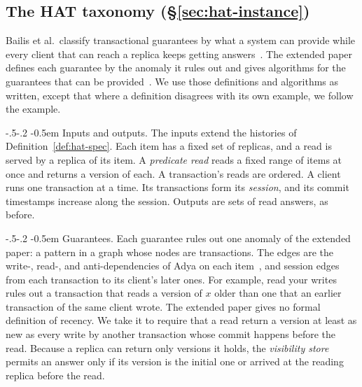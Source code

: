 \documentclass[sigconf]{cidr-2027}
\makeatletter
\theoremstyle{remark}
\renewcommand\paragraph{\@startsection{paragraph}{4}{\z@}%
  {-.5\baselineskip \@plus -2\p@ \@minus -.2\p@}%
  {-0.5em}%
  {\normalfont\bfseries}}
\makeatother
\begin{document}
\subsection{The HAT taxonomy (\S\ref{sec:hat-instance})}
\label{app:hat-taxonomy}

Bailis et al.\ classify transactional guarantees by what a system can provide
while every client that can reach a replica keeps getting
answers~\cite{bailis2013hat}. The extended paper defines each guarantee by
the anomaly it rules out and gives algorithms for the guarantees that can be
provided~\cite{bailis2013hatextended}. We use those definitions and
algorithms as written, except that where a definition disagrees with its own
example, we follow the example.

\paragraph{Inputs and outputs.}
The inputs extend the histories of Definition~\ref{def:hat-spec}. Each item
has a fixed set of replicas, and a read is served by a replica of its item. A
\emph{predicate read} reads a fixed range of items at once and returns a
version of each. A transaction's reads are ordered. A client runs one
transaction at a time. Its transactions form its \emph{session}, and its
commit timestamps increase along the session. Outputs are sets of read
answers, as before.

\paragraph{Guarantees.}
Each guarantee rules out one anomaly of the extended paper: a pattern in a
graph whose nodes are transactions. The edges are the write-, read-, and
anti-dependencies of Adya on each item~\cite{adya1999weakconsistency}, and
session edges from each transaction to its client's later ones. For example,
read your writes rules out a transaction that reads a version of $x$ older
than one that an earlier transaction of the same client wrote. The extended
paper gives no formal definition of recency. We take it to require that a
read return a version at least as new as every write by another transaction
whose commit happens before the read. Because a replica can return only
versions it holds, the \emph{visibility store} permits an answer only if its
version is the initial one or arrived at the reading replica before the
read.
\end{document}
